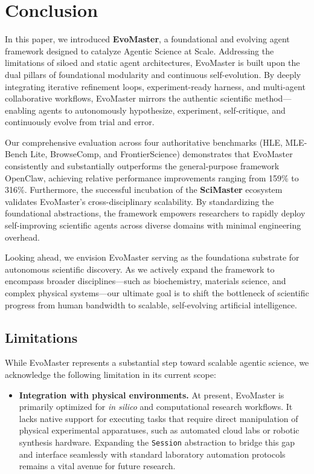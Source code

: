 \documentclass[11pt, a4paper, logo, copyright, nonumbering]{cls/Sci}
\begin{document}
\section{Conclusion}
\label{sec:conclusion}

In this paper, we introduced \textbf{EvoMaster}, a foundational and evolving agent framework designed to catalyze Agentic Science at Scale. Addressing the limitations of siloed and static agent architectures, EvoMaster is built upon the dual pillars of foundational modularity and continuous self-evolution. By deeply integrating iterative refinement loops, experiment-ready harness, and multi-agent collaborative workflows, EvoMaster mirrors the authentic scientific method---enabling agents to autonomously hypothesize, experiment, self-critique, and continuously evolve from trial and error.

Our comprehensive evaluation across four authoritative benchmarks (HLE, MLE-Bench Lite, BrowseComp, and FrontierScience) demonstrates that EvoMaster consistently and substantially outperforms the general-purpose framework OpenClaw, achieving relative performance improvements ranging from 159\% to 316\%. Furthermore, the successful incubation of the \textbf{SciMaster} ecosystem validates EvoMaster's cross-disciplinary scalability. By standardizing the foundational abstractions, the framework empowers researchers to rapidly deploy self-improving scientific agents across diverse domains with minimal engineering overhead.

Looking ahead, we envision EvoMaster serving as the foundationa substrate for autonomous scientific discovery. As we actively expand the framework to encompass broader disciplines---such as biochemistry, materials science, and complex physical systems---our ultimate goal is to shift the bottleneck of scientific progress from human bandwidth to scalable, self-evolving artificial intelligence.

\subsection*{Limitations}

While EvoMaster represents a substantial step toward scalable agentic science, we acknowledge the following limitation in its current scope:
\begin{itemize}[leftmargin=*, nosep]
    \item \textbf{Integration with physical environments.} At present, EvoMaster is primarily optimized for \emph{in silico} and computational research workflows. It lacks native support for executing tasks that require direct manipulation of physical experimental apparatuses, such as automated cloud labs or robotic synthesis hardware. Expanding the \texttt{Session} abstraction to bridge this gap and interface seamlessly with standard laboratory automation protocols remains a vital avenue for future research.
\end{itemize}
\end{document}
